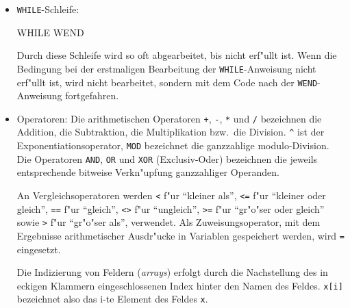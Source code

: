 \begin{itemize}
\item \verb|WHILE|-Schleife:
\begin{verbatimcmd}
WHILE 
WEND
\end{verbatimcmd}
Durch diese Schleife wird  so oft abgearbeitet, bis
 nicht erf"ullt ist. Wenn die Bedingung bei
der erstmaligen Bearbeitung der \verb|WHILE|-Anweisung nicht erf"ullt
ist, wird  nicht bearbeitet, sondern mit dem Code nach
der \verb|WEND|-Anweisung fortgefahren.

\item Operatoren: Die arithmetischen Operatoren \verb|+|, \verb|-|, \verb|*| und \verb|/|
bezeichnen die Addition, die Subtraktion, die Multiplikation bzw.\ die
Division. \verb|^| ist der Exponentiationsoperator, \verb|MOD| bezeichnet
die ganzzahlige modulo-Division. Die Operatoren \verb|AND|, \verb|OR| und
\verb|XOR| (Exclusiv-Oder) bezeichnen die jeweils entsprechende bitweise
Verkn"upfung ganzzahliger Operanden.

An Vergleichsoperatoren werden \verb|<| f"ur "`kleiner als"', 
\verb|<=| f"ur "`kleiner oder gleich"', \verb|==| f"ur "`gleich"', 
\verb|<>| f"ur "`ungleich"',
\verb|>=| f"ur "`gr"o"ser oder gleich"' sowie \verb|>| f"ur "`gr"o"ser als"', 
verwendet. Als Zuweisungsoperator, mit dem Ergebnisse arithmetischer
Ausdr"ucke in Variablen gespeichert werden, wird \verb|=| eingesetzt.

Die Indizierung von Feldern (\textsl{arrays}) erfolgt durch die Nachstellung
des in eckigen Klammern eingeschlossenen Index hinter den Namen des Feldes.
\verb|x[i]| bezeichnet also das i-te Element des Feldes \verb|x|.

\end{itemize}

